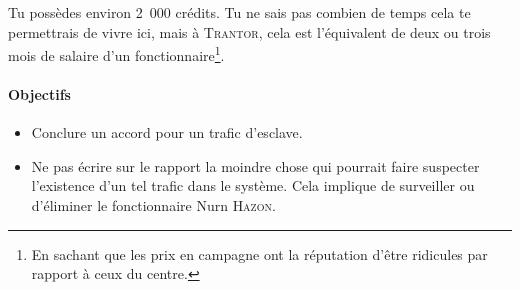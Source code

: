 {Tu possèdes environ 2~000 crédits.
Tu ne sais pas combien de temps cela te permettrais de vivre ici, mais à \textsc{Trantor}, cela est l’équivalent de deux ou trois mois de salaire d’un fonctionnaire\footnote{En sachant que les prix en campagne ont la réputation d’être ridicules par rapport à ceux du centre.}.

\paragraph{Objectifs}{
\begin{itemize}
	\item Conclure un accord pour un trafic d’esclave.
	\item Ne pas écrire sur le rapport la moindre chose qui pourrait faire suspecter l’existence d’un tel trafic dans le système.  Cela implique de surveiller ou d’éliminer le fonctionnaire Nurn \textsc{Hazon}.
\end{itemize}
}
}

